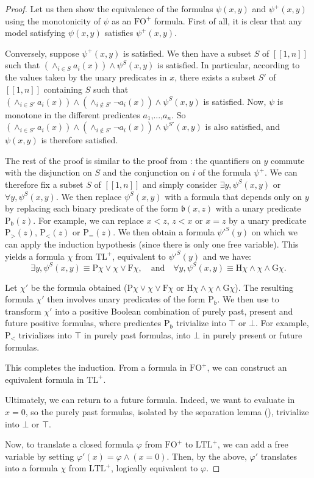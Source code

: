 \documentclass[a4paper,UKenglish,cleveref, autoref, thm-restate]{lipics-v2021}
\newcommand{\FO}{\mathrm{FO}}
\newcommand{\FOp}{\FO^+}
\newcommand{\LTL}{\mathrm{LTL}}
\newcommand{\LTLp}{\LTL^+}
\newcommand{\TL}{\mathrm{TL}}
\newcommand{\TLp}{\TL^+}
\renewcommand{\P}{\mathrm{P}}
\newcommand{\F}{\mathrm{F}}
\renewcommand{\H}{\mathrm{H}}
\newcommand{\G}{\mathrm{G}}
\renewcommand{\b}{\mathfrak{b}}
\begin{document}
\begin{proof}
    Let us then show the equivalence of the formulas $\psi(x,y)$ and $\psi^+(x,y)$ using the monotonicity of $\psi$ as an $\FOp$ formula. 
    First of all, it is clear that any model satisfying $\psi(x,y)$ satisfies $\psi^+(x,y)$.

    Conversely, suppose $\psi^+(x,y)$ is satisfied. We then have a subset $S$ of $[\![1,n]\!]$ such that $(\wedge_{i \in S} a_i(x))
    \land \psi^S(x,y)$ is satisfied. In particular, according to the values taken by the unary predicates in $x$, there exists a subset $S'$ of $[\![1,n]\!]$ containing $S$ such that $(\wedge_{i \in S'} a_i(x)) \land (\wedge_{i \notin S'} \neg a_i(x))
    \land \psi^S(x,y)$ is satisfied. Now, $\psi$ is monotone in the different predicates $a_1$,...,$a_n$. So $(\wedge_{i \in S'} a_i(x)) \land (\wedge_{i \notin S'} \neg a_i(x))
    \land \psi^{S'}(x,y)$ is also satisfied, and $\psi(x,y)$ is therefore satisfied.

    The rest of the proof is similar to the proof from \cite{FOtoLTL}:
    the quantifiers on $y$ commute with the disjunction on $S$ and the conjunction on $i$ of the formula $\psi^+$. We can therefore fix a subset $S$ of $[\![1,n]\!]$ and simply consider $\exists y, \psi^S(x,y)$ or $\forall y, \psi^S(x,y)$.
    We then replace $\psi^S(x,y)$ with a formula that depends only on $y$ by replacing each binary predicate of the form $\b(x,z)$ with a unary predicate $\P_{\b}(z)$.
    For example, we can replace $x<z$, $z<x$ or $x=z$ by a unary predicate $\P_>(z)$, $\P_<(z)$ or $\P_=(z)$. 
    We then obtain a formula $\psi'^{S}(y)$ on which we can apply the induction hypothesis (since there is only one free variable). This yields a formula $\chi$ from $\TLp$, equivalent to $\psi'^{S}(y)$ and we have:
    $$
    \exists y, \psi^{S}(x,y) \equiv \P \chi \lor \chi \lor \F \chi,
   \text{~~~and~~~}
    \forall y, \psi^{S}(x,y) \equiv \H \chi \land \chi \land \G \chi.
    $$

    Let $\chi'$ be the formula obtained ($\P \chi \lor \chi \lor \F \chi$ or $\H \chi \land \chi \land \G \chi$).
    The resulting formula $\chi'$ then involves unary predicates of the form $\P_{\b}$. We then use  to transform $\chi'$ into a positive Boolean combination of purely past, present and future positive formulas, where predicates $\P_\b$ trivialize into $\top$ or $\bot$.
    For example, $\P_<$ trivializes into $\top$ in purely past formulas, into $\bot$ in purely present or future formulas.

    This completes the induction. From a formula in $\FOp$, we can construct an equivalent formula in $\TLp$.

    Ultimately, we can return to a future formula. Indeed, we want to evaluate in $x=0$, so the purely past formulas, isolated by the separation lemma (), trivialize into $\bot$ or $\top$.

    
    Now, to translate a closed formula $\varphi$ from $\FOp$ to $\LTLp$, we can add a free variable by setting $\varphi'(x) = \varphi \land (x=0)$. Then, by the above, $\varphi'$ translates into a formula $\chi$ from $\LTLp$, logically equivalent to $\varphi$.

\end{proof}
\end{document}
